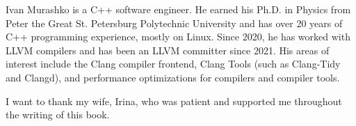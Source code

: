 Ivan Murashko is a C++ software engineer. He earned his Ph.D. in Physics from Peter the Great St. Petersburg Polytechnic University and has over 20 years of C++ programming experience, mostly on Linux. Since 2020, he has worked with LLVM compilers and has been an LLVM committer since 2021. His areas of interest include the Clang compiler frontend, Clang Tools (such as Clang-Tidy and Clangd), and performance optimizations for compilers and compiler tools.

I want to thank my wife, Irina, who was patient and supported me throughout the writing of this book.
